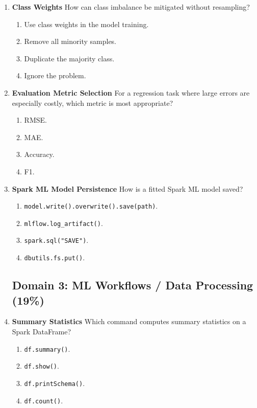 \documentclass{article}
\begin{document}
\begin{enumerate}[label=\textbf{Q\arabic*.}]
		\item \textbf{Class Weights}
		How can class imbalance be mitigated without resampling?
		\begin{enumerate}[label=\Alph*.]
			\item Use class weights in the model training.
			\item Remove all minority samples.
			\item Duplicate the majority class.
			\item Ignore the problem.
		\end{enumerate}
		
		\item \textbf{Evaluation Metric Selection}
		For a regression task where large errors are especially costly, which metric is most appropriate?
		\begin{enumerate}[label=\Alph*.]
			\item RMSE.
			\item MAE.
			\item Accuracy.
			\item F1.
		\end{enumerate}
		
		\item \textbf{Spark ML Model Persistence}
		How is a fitted Spark ML model saved?
		\begin{enumerate}[label=\Alph*.]
			\item \texttt{model.write().overwrite().save(path)}.
			\item \texttt{mlflow.log\_artifact()}.
			\item \texttt{spark.sql("SAVE")}.
			\item \texttt{dbutils.fs.put()}.
		\end{enumerate}
		
		\subsection*{Domain 3: ML Workflows / Data Processing (19\%)}
		
		\item \textbf{Summary Statistics}
		Which command computes summary statistics on a Spark DataFrame?
		\begin{enumerate}[label=\Alph*.]
			\item \texttt{df.summary()}.
			\item \texttt{df.show()}.
			\item \texttt{df.printSchema()}.
			\item \texttt{df.count()}.
		\end{enumerate}
		

\end{enumerate}
\end{document}
